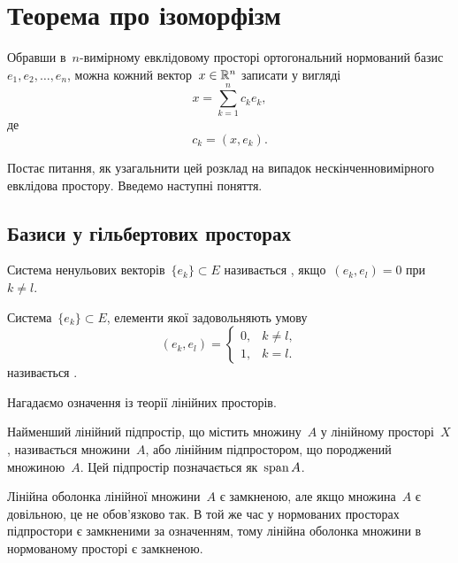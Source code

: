 \chapter{Теорема про ізоморфізм}

Обравши в~$n$-вимірному евклідовому просторі ортогональний нормований базис~$e_1, e_2, \dots, e_n$, можна кожний вектор~$x \in \mathbb{R}^n$ записати у вигляді
\begin{equation*}
    x = \sum_{k = 1}^n c_k e_k,
\end{equation*}
де 
\begin{equation*}
    c_k = (x, e_k).
\end{equation*}

Постає питання, як узагальнити цей розклад на випадок нескінченновимірного евклідова простору. Введемо наступні поняття.

\section{Базиси у гільбертових просторах}

\begin{definition}
    Система ненульових векторів~$\{e_k\} \subset E$ називається , якщо~$(e_k, e_l) = 0$ при~$k \ne l$.
\end{definition}

\begin{definition}
    Система~$\{e_k\} \subset E$, елементи якої задовольняють умову
    \begin{equation*}
        (e_k, e_l) = \begin{cases}
            0, & k \ne l, \\
            1, & k = l.
        \end{cases}
    \end{equation*}
    називається .
\end{definition}

Нагадаємо означення із теорії лінійних просторів.

\begin{definition}
    Найменший лінійний підпростір, що містить множину~$A$ у лінійному просторі~$X$, називається  множини~$A$, або лінійним підпростором, що породжений множиною~$A$. Цей підпростір позначається як~$\operatorname{span} A$.
\end{definition}

\begin{remark}
    Лінійна оболонка лінійної множини~$A$ є замкненою, але якщо множина~$A$ є довільною, це не обов'язково так. В той же час у нормованих просторах підпростори є замкненими за означенням, тому лінійна оболонка множини в нормованому просторі є замкненою.
\end{remark}

